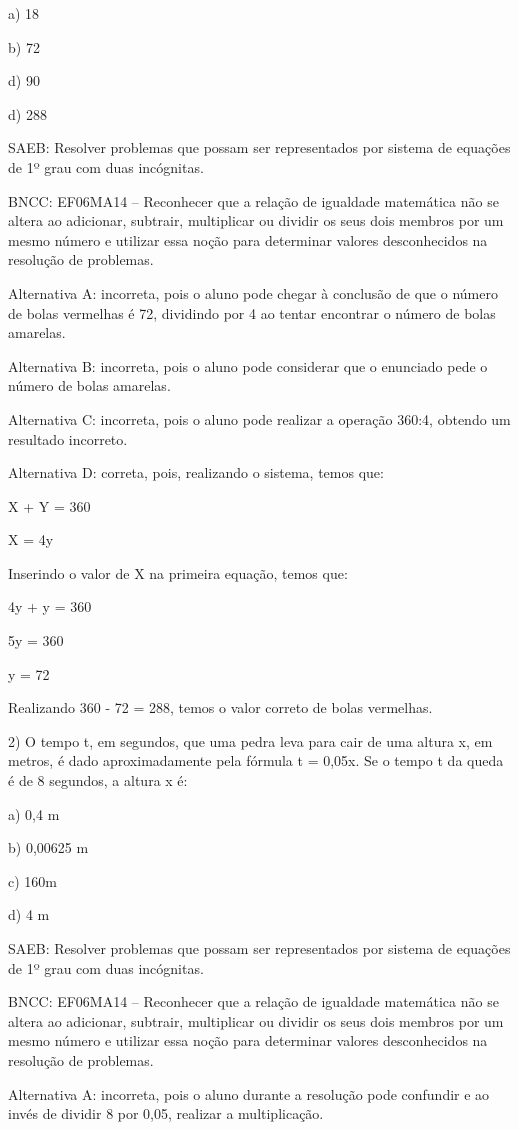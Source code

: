 a) 18

b) 72

d) 90

d) 288

SAEB: Resolver problemas que possam ser representados por sistema de
equações de 1º grau com duas incógnitas.

BNCC: EF06MA14 -- Reconhecer que a relação de igualdade matemática não
se altera ao adicionar, subtrair, multiplicar ou dividir os seus dois
membros por um mesmo número e utilizar essa noção para determinar
valores desconhecidos na resolução de problemas.

Alternativa A: incorreta, pois o aluno pode chegar à conclusão de que o
número de bolas vermelhas é 72, dividindo por 4 ao tentar encontrar o
número de bolas amarelas.

Alternativa B: incorreta, pois o aluno pode considerar que o enunciado
pede o número de bolas amarelas.

Alternativa C: incorreta, pois o aluno pode realizar a operação 360:4,
obtendo um resultado incorreto.

Alternativa D: correta, pois, realizando o sistema, temos que:

X + Y = 360

X = 4y

Inserindo o valor de X na primeira equação, temos que:

4y + y = 360

5y = 360

y = 72

Realizando 360 - 72 = 288, temos o valor correto de bolas vermelhas.

2) O tempo t, em segundos, que uma pedra leva para cair de uma altura x,
em metros, é dado aproximadamente pela fórmula t = 0,05x. Se o tempo t
da queda é de 8 segundos, a altura x é:

a) 0,4 m

b) 0,00625 m

c) 160m

d) 4 m

SAEB: Resolver problemas que possam ser representados por sistema de
equações de 1º grau com duas incógnitas.

BNCC: EF06MA14 -- Reconhecer que a relação de igualdade matemática não
se altera ao adicionar, subtrair, multiplicar ou dividir os seus dois
membros por um mesmo número e utilizar essa noção para determinar
valores desconhecidos na resolução de problemas.

Alternativa A: incorreta, pois o aluno durante a resolução pode
confundir e ao invés de dividir 8 por 0,05, realizar a multiplicação.

